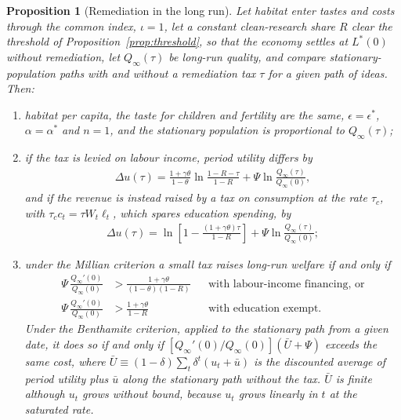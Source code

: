 \documentclass[11pt]{article}
\newtheorem{proposition}{Proposition}
\begin{document}
\begin{proposition}[Remediation in the long run]
\label{prop:welfare}
Let habitat enter tastes and costs through the common index, $\iota=1$, let a constant clean-research
share $R$ clear the threshold of Proposition~\ref{prop:threshold}, so that the economy settles at
$L^\ast(0)$ without remediation, let $Q_\infty(\tau)$ be long-run quality, and compare
stationary-population paths with and without a remediation tax $\tau$ for a given path of ideas. Then:
\begin{enumerate}
\item[(i)] habitat per capita, the taste for children and fertility are the same,
$\epsilon=\epsilon^\ast$, $\alpha=\alpha^\ast$ and $n=1$, and the stationary population is proportional
to $Q_\infty(\tau)$;
\item[(ii)] if the tax is levied on labour income, period utility differs by
\begin{align}
\Delta u(\tau)=\frac{1+\gamma\theta}{1-\theta}\ln\frac{1-R-\tau}{1-R}+\Psi\ln\frac{Q_\infty(\tau)}{Q_\infty(0)},
\label{eq:du_labour}
\end{align}
and if the revenue is instead raised by a tax on consumption at the rate $\tau_c$, with
$\tau_cc_t=\tau W_t\ell_t$, which spares education spending, by
\begin{align*}
\Delta u(\tau)=\ln\left[1-\frac{(1+\gamma\theta)\tau}{1-R}\right]+\Psi\ln\frac{Q_\infty(\tau)}{Q_\infty(0)};
\end{align*}
\item[(iii)] under the Millian criterion a small tax raises long-run welfare if and only if
\begin{align*}
\Psi\,\frac{Q_\infty'(0)}{Q_\infty(0)}&>\frac{1+\gamma\theta}{(1-\theta)(1-R)}
&&\text{with labour-income financing, or}\\
\Psi\,\frac{Q_\infty'(0)}{Q_\infty(0)}&>\frac{1+\gamma\theta}{1-R}
&&\text{with education exempt.}
\end{align*}
Under the Benthamite criterion, applied to the stationary path from a given date, it does so if and only
if $\left[Q_\infty'(0)/Q_\infty(0)\right]\left(\bar U+\Psi\right)$ exceeds the same cost, where
$\bar U\equiv(1-\delta)\sum_t\delta^t(u_t+\bar u)$ is the discounted average of period utility plus $\bar u$
along the stationary path without the tax. $\bar U$ is finite although $u_t$ grows without bound,
because $u_t$ grows linearly in $t$ at the saturated rate.
\end{enumerate}
\end{proposition}
\end{document}
